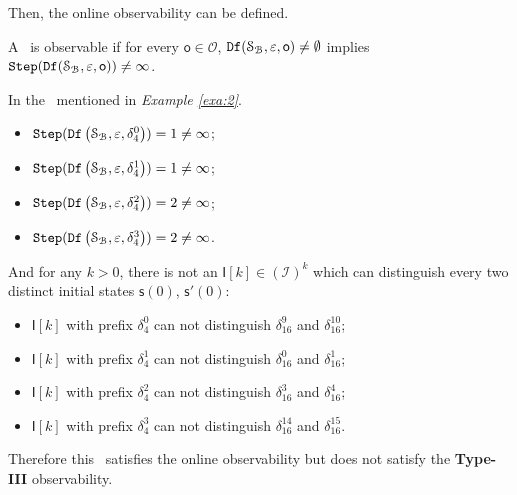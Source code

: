 

Then, the online observability can be defined.
\begin{definition}
 A \BCN\ is observable
if for every $\mathsf{o}\in  \mathcal{O}$, ${\tt Df}(\mathcal{S}_{\mathcal{B}},\varepsilon, \mathsf{o})\ne\emptyset$ implies ${\tt Step}({\tt Df}(\mathcal{S}_{\mathcal{B}},\varepsilon,\mathsf{o}))\ne\infty$.
\end{definition}


\begin{example}
In the \BCN\ mentioned in {\em Example \ref{exa:2}}.  
 \begin{itemize}
 \item ${\tt Step}({\tt Df}\left(\mathcal{S}_{\mathcal{B}},\varepsilon, \delta_{4}^0\right))=1\ne \infty$;
 \item ${\tt Step}({\tt Df}\left(\mathcal{S}_{\mathcal{B}},\varepsilon, \delta_{4}^1\right))=1\ne \infty$;
 \item ${\tt Step}({\tt Df}\left(\mathcal{S}_{\mathcal{B}},\varepsilon, \delta_{4}^2\right))=2\ne \infty$;
 \item ${\tt Step}({\tt Df}\left(\mathcal{S}_{\mathcal{B}},\varepsilon, \delta_{4}^3\right))=2\ne \infty$.
 \end{itemize}
 
 And for any $k>0$, there is not an $\mathsf{I}[k]\in(\mathcal{I})^k$ which can distinguish every two distinct initial states $\mathsf{s}(0)$, $\mathsf{s}'(0)$:
\begin{itemize}
  \item $\mathsf{I}[k]$ with prefix $\delta_{4}^0$ can not distinguish $\delta_{16}^9$ and $\delta_{16}^{10}$;
  \item $\mathsf{I}[k]$ with prefix $\delta_{4}^1$ can not distinguish $\delta_{16}^0$ and $\delta_{16}^{1}$;
  \item $\mathsf{I}[k]$ with prefix $\delta_{4}^2$ can not distinguish $\delta_{16}^3$ and $\delta_{16}^{4}$;
  \item $\mathsf{I}[k]$ with prefix $\delta_{4}^3$ can not distinguish $\delta_{16}^{14}$ and $\delta_{16}^{15}$.
\end{itemize} 
Therefore this \BCN\ satisfies the online observability but does not satisfy the {\bf Type-III} observability.%
\label{exa:10}
\end{example}  

